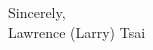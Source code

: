 \documentclass[10.5pt,a4]{article}
\newcommand{\bold}[1]{ {\bfseries #1}}
\begin{document}






\vspace{0.5cm}
\raggedright
Sincerely, \\ Lawrence (Larry) Tsai %
\end{document}
